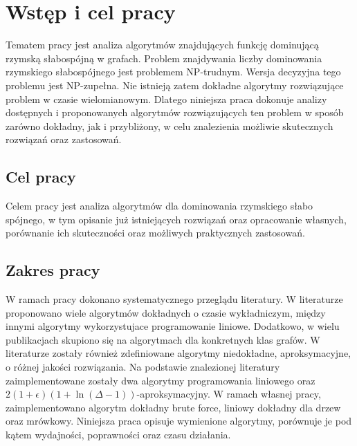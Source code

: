 \chapter{Wstęp i cel pracy}
Tematem pracy jest analiza algorytmów znajdujących funkcję dominującą rzymską słabospójną w grafach.
Problem znajdywania liczby dominowania rzymskiego słabospójnego jest problemem NP-trudnym. Wersja decyzyjna tego problemu jest NP-zupełna. Nie istnieją zatem dokładne algorytmy rozwiązujące problem w czasie wielomianowym. Dlatego niniejsza praca dokonuje analizy dostępnych i proponowanych algorytmów rozwiązujących ten problem w sposób zarówno dokładny, jak i przybliżony, w celu znalezienia możliwie skutecznych rozwiązań oraz zastosowań.

\section{Cel pracy}
Celem pracy jest analiza algorytmów dla dominowania rzymskiego słabo spójnego, w tym opisanie już istniejących rozwiązań oraz opracowanie własnych, porównanie ich skuteczności oraz możliwych praktycznych zastosowań.

\section{Zakres pracy}
W ramach pracy dokonano systematycznego przeglądu literatury. W literaturze proponowano wiele algorytmów dokładnych o czasie wykładniczym, między innymi algorytmy wykorzystujace programowanie liniowe. Dodatkowo, w wielu publikacjach skupiono się na algorytmach dla konkretnych klas grafów. W literaturze zostały również zdefiniowane algorytmy niedokładne, aproksymacyjne, o różnej jakości rozwiązania.
Na podstawie znalezionej literatury zaimplementowane zostały dwa algorytmy programowania liniowego oraz $2(1+\epsilon)(1 + \ln(\Delta - 1))$-aproksymacyjny. W ramach własnej pracy, zaimplementowano algorytm dokładny brute force, liniowy dokładny dla drzew oraz mrówkowy.
Niniejsza praca opisuje wymienione algorytmy, porównuje je pod kątem wydajności, poprawności oraz czasu działania.

